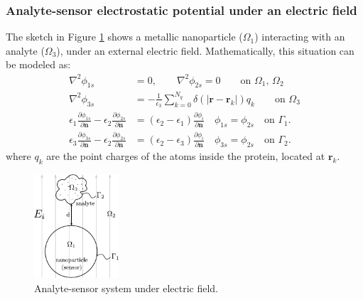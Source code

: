 \subsubsection{Analyte-sensor electrostatic potential under an electric field}

The sketch in Figure \ref{fig:analyte-sensor} shows a metallic nanoparticle ($\Omega_1$) interacting with an analyte ($\Omega_3$), under an external electric field.
Mathematically, this situation can be modeled as:
%
\begin{align}\label{eq:electrostatic_scatter_prot_sen}
\nabla^2 \phi_{1s} &= 0, \qquad \nabla^2 \phi_{2s} = 0 \qquad\text{on $\Omega_1$, $\Omega_2$} \nonumber\\
\nabla^2 \phi_{3s} &= -\frac{1}{\epsilon_3} \sum_{k=0}^{N_q} \delta(|\mathbf{r}-\mathbf{r}_k|) q_k \qquad\text{on $\Omega_3$} \nonumber \\
\epsilon_1\frac{\partial\phi_{1s}}{\partial \mathbf{n}} - \epsilon_2\frac{\partial\phi_{2s}}{\partial\mathbf{n}} &= (\epsilon_2-\epsilon_1)\frac{\partial\phi_i}{\partial\mathbf{n}} \quad \phi_{1s} = \phi_{2s} \quad \text{on $\Gamma_1$}. \nonumber\\
\epsilon_3\frac{\partial\phi_{3s}}{\partial \mathbf{n}} - \epsilon_2\frac{\partial\phi_{2s}}{\partial\mathbf{n}} &= (\epsilon_2-\epsilon_3)\frac{\partial\phi_i}{\partial\mathbf{n}} \quad \phi_{3s} = \phi_{2s} \quad \text{on $\Gamma_2$}.
\end{align}
%
where $q_k$ are the point charges of the atoms inside the protein, located at $\mathbf{r}_k$.

\begin{figure}[b] %
   \centering
   \includegraphics[width=0.28\textwidth]{protein_sensor_regions.pdf} 
   \caption{Analyte-sensor system under electric field.}
   \label{fig:analyte-sensor}
\end{figure}

